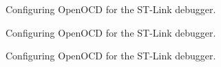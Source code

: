 \documentclass{UoNMCHA}
\numberwithin{equation}{section}
\begin{document}
\begin{enumerate}
    \begin{figure}[H]
    \caption{Configuring OpenOCD for the ST-Link debugger.}
    \label{fig:debug_noelf}
    \end{figure}

   \begin{figure}[H]
    \caption{Configuring OpenOCD for the ST-Link debugger.}
    \label{fig:elf_selection}
    \end{figure}

   \begin{figure}[H]
    \caption{Configuring OpenOCD for the ST-Link debugger.}
    \label{fig:elf_filled_in}
    \end{figure}



\end{enumerate}
\end{document}
